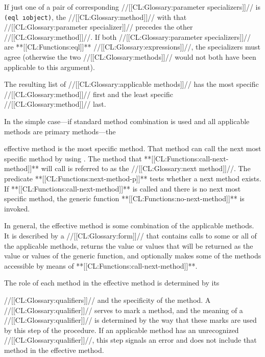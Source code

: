 If just one of a pair of corresponding //[[CL:Glossary:parameter specializers]]// is {\tt (eql \i{object})},
the //[[CL:Glossary:method]]// with that //[[CL:Glossary:parameter specializer]]// precedes the
other //[[CL:Glossary:method]]//.  If both //[[CL:Glossary:parameter specializers]]// are **[[CL:Functions:eql]]**
//[[CL:Glossary:expressions]]//, the
specializers must agree (otherwise the two //[[CL:Glossary:methods]]// would
not both have been applicable to this argument).

The resulting list of //[[CL:Glossary:applicable methods]]// has the most specific
//[[CL:Glossary:method]]// first and the least specific //[[CL:Glossary:method]]// last.    

\endsubsubsubsection%


In the simple case---if standard method combination is used and all
applicable methods are primary methods---the 

effective method is the most specific method.
That method can call the next most specific
method by using .  The method that
**[[CL:Functions:call-next-method]]** will call is referred to as the 
//[[CL:Glossary:next method]]//.  The predicate **[[CL:Functions:next-method-p]]** tests whether a next
method exists.  If **[[CL:Functions:call-next-method]]** is called and there is no
next most specific method, the generic function **[[CL:Functions:no-next-method]]**
is invoked.

In general, the effective method is some combination of the applicable
methods.  It is described by a //[[CL:Glossary:form]]// that contains calls to some or
all of the applicable methods, returns the value or values that will
be returned as the value or values of the generic function, and
optionally makes some of the methods accessible by means of 
**[[CL:Functions:call-next-method]]**.





The role of each method in the effective method is determined by its

//[[CL:Glossary:qualifiers]]// and the specificity of the method.  A //[[CL:Glossary:qualifier]]//
serves to mark a method, and the meaning of a //[[CL:Glossary:qualifier]]// is
determined by the way that these marks are used by this step
of the procedure.  If an applicable method has an unrecognized
//[[CL:Glossary:qualifier]]//, this step signals an error and does not include that method
in the effective method.

